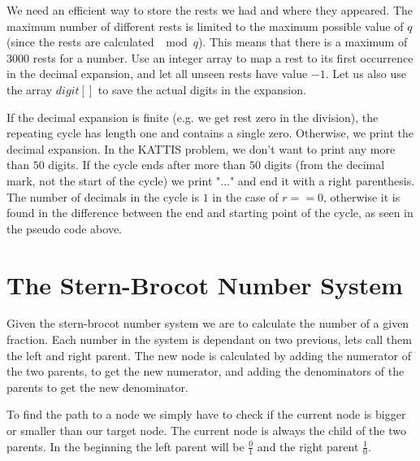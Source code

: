 \documentclass[11pt,a4paper,twoside]{article}
\begin{document}
We need an efficient way to store the rests we had and where they appeared. The
maximum number of different rests is limited to the maximum possible value of
$q$ (since the rests are calculated $\mod q$). This means that there is a
maximum of $3000$ rests for a number. Use an integer array to map a rest to its
first occurrence in the decimal expansion, and let all unseen rests have value
$-1$.  Let us also use the array $digit[]$ to save the actual digits in the
expansion.

       
If the decimal expansion is finite (e.g. we get rest zero in the division), the
repeating cycle has length one and contains a single zero. Otherwise, we print
the decimal expansion. In the KATTIS problem, we don't want to print any more
than $50$ digits. If the cycle ends after more than $50$ digits (from the
decimal mark, not the start of the cycle) we print "..." and end it with a
right parenthesis. The number of decimals in the cycle is $1$ in the case of
$r==0$, otherwise it is found in the difference between the end and starting
point of the cycle, as seen in the pseudo code above.

\section{The Stern-Brocot Number System}

Given the stern-brocot number system we are to calculate the number of a given
fraction. Each number in the system is dependant on two previous, lets call
them the left and right parent. The new node is calculated by adding the
numerator of the two parents, to get the new numerator, and adding the
denominators of the parents to get the new denominator.


To find the path to a node we simply have to check if the current node is
bigger or smaller than our target node. The current node is always the child of
the two parents. In the beginning the left parent will be $\frac{0}{1}$ and the
right parent $\frac{1}{0}$.

\end{document}
